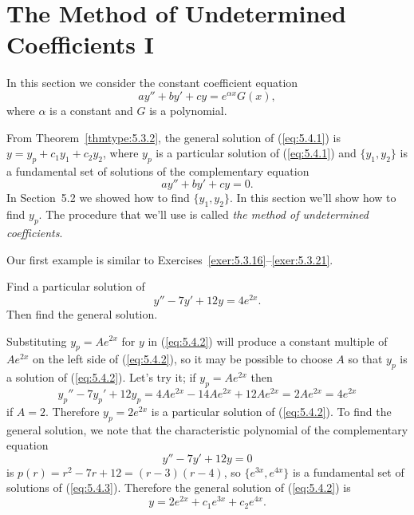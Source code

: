 \section{The Method of Undetermined Coefficients I}

\noindent
In this section we consider the constant coefficient equation
\begin{equation}
  \label{eq:5.4.1}ay''+by'+cy=e^{\alpha x}G(x),
\end{equation}
where $\alpha$ is a constant and $G$ is a polynomial.

From Theorem~\ref{thmtype:5.3.2}, the general solution of (\ref{eq:5.4.1}) is
$y=y_{p}+c_{1}y_{1}+c_{2}y_{2}$, where $y_{p}$ is a particular solution of (\ref{eq:5.4.1}) and
$\{y_{1},y_{2}\}$ is a fundamental set of solutions of the complementary equation
\[
  ay''+by'+cy=0.
\]
In Section~5.2 we showed how to find $\{y_{1},y_{2}\}$. In this section we'll show how to find
$y_{p}$. The procedure that we'll use is called {\color{blue}\it the method of undetermined
coefficients\/}.

Our first example is similar to Exercises~\ref{exer:5.3.16}--\ref{exer:5.3.21}.

\begin{example}
  \label{example:5.4.1} \rm Find a particular solution of
  \begin{equation}
    \label{eq:5.4.2}y''-7y'+12y=4e^{2x}.
  \end{equation}
  Then find the general solution.
\end{example}

\begin{examplesolution}
\solution Substituting $y_{p}=Ae^{2x}$ for $y$ in (\ref{eq:5.4.2}) will produce a constant multiple
of $Ae^{2x}$ on the left side of (\ref{eq:5.4.2}), so it may be possible to choose $A$ so that
$y_{p}$ is a solution of (\ref{eq:5.4.2}). Let's try it; if $y_{p}=Ae^{2x}$ then
\[
  y_{p}''-7y_{p}'+12y_{p}=4Ae^{2x}-14Ae^{2x}+12Ae^{2x}=2Ae^{2x}=4e^{2x}
\]
if $A=2$. Therefore $y_{p}=2e^{2x}$ is a particular solution of (\ref{eq:5.4.2}). To find the
general solution, we note that the characteristic polynomial of the complementary equation
\begin{equation}
  \label{eq:5.4.3}y''-7y'+12y=0
\end{equation}
is $p(r)=r^{2}-7r+12=(r-3)(r-4)$, so $\{e^{3x},e^{4x}\}$ is a fundamental set of solutions of
(\ref{eq:5.4.3}). Therefore the general solution of (\ref{eq:5.4.2}) is
\[
  y=2e^{2x}+c_{1}e^{3x}+c_{2}e^{4x}.
\]
\end{examplesolution}

